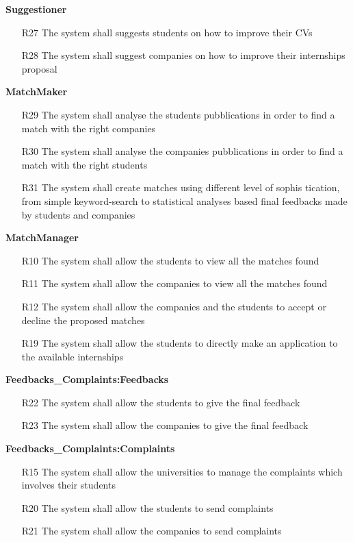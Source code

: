 \documentclass{article}
\begin{document}
\textbf{Suggestioner}
\begin{itemize}
    \item [R27] The system shall suggests students on how to improve their CVs
    \item [R28] The system shall suggest companies on how to improve their internships proposal
\end{itemize}

\textbf{MatchMaker}
\begin{itemize}
    \item [R29] The system shall analyse the students pubblications in order to find a match with the right companies
    \item [R30] The system shall analyse the companies pubblications in order to find a match with the right students
    \item [R31] The system shall create matches using different level of sophis tication, from simple keyword-search to statistical analyses based final feedbacks made by students and companies
\end{itemize}

\textbf{MatchManager}
\begin{itemize}
    \item [R10] The system shall allow the students to view all the matches found
    \item [R11] The system shall allow the companies to view all the matches found
    \item [R12] The system shall allow the companies and the students to accept or decline the proposed matches
    \item [R19] The system shall allow the students to directly make an application to the available internships
\end{itemize}

\textbf{Feedbacks\_Complaints:Feedbacks}
\begin{itemize}
    \item [R22] The system shall allow the students to give the final feedback
    \item [R23] The system shall allow the companies to give the final feedback
\end{itemize}

\textbf{Feedbacks\_Complaints:Complaints}
\begin{itemize}
    \item [R15] The system shall allow the universities to manage the complaints which involves their students
    \item [R20] The system shall allow the students to send complaints
    \item [R21] The system shall allow the companies to send complaints
\end{itemize}
\end{document}

